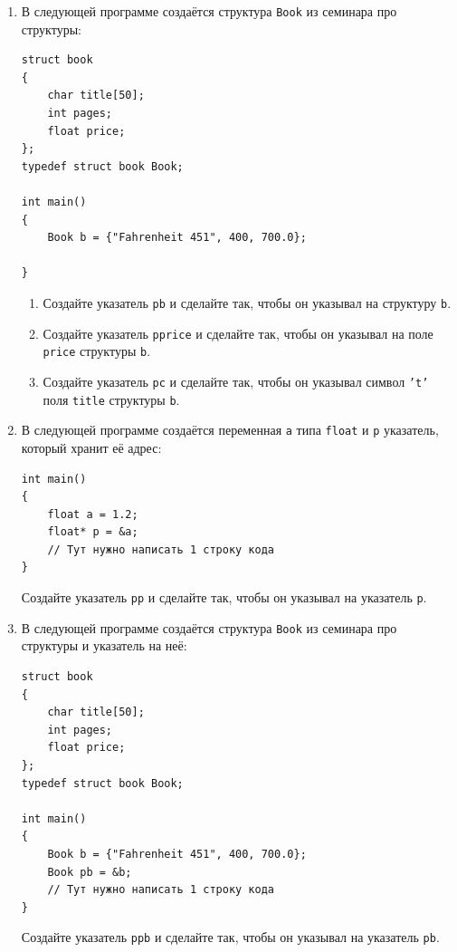 \documentclass{article}
\begin{document}
\begin{enumerate}
\newpage
\item В следующей программе создаётся структура \texttt{Book} из семинара про структуры:
\begin{lstlisting}
struct book 
{
    char title[50];
    int pages;
    float price;
};
typedef struct book Book;

int main() 
{
    Book b = {"Fahrenheit 451", 400, 700.0};

}
\end{lstlisting}

\begin{enumerate}
\item Создайте указатель \texttt{pb} и сделайте так, чтобы он указывал на структуру \texttt{b}.
\item Создайте указатель \texttt{pprice} и сделайте так, чтобы он указывал на поле \texttt{price} структуры \texttt{b}.
\item Создайте указатель \texttt{pc} и сделайте так, чтобы он указывал символ \texttt{'t'} поля \texttt{title} структуры \texttt{b}.
\end{enumerate} 


\item В следующей программе создаётся переменная \texttt{a} типа \texttt{float} и \texttt{p} указатель, который хранит её адрес:
\begin{lstlisting}
int main() 
{
    float a = 1.2;
    float* p = &a;
    // Тут нужно написать 1 строку кода
}
\end{lstlisting}
Создайте указатель \texttt{pp} и сделайте так, чтобы он указывал на указатель \texttt{p}.


\item В следующей программе создаётся структура \texttt{Book} из семинара про структуры и указатель на неё:
\begin{lstlisting}
struct book 
{
    char title[50];
    int pages;
    float price;
};
typedef struct book Book;

int main() 
{
    Book b = {"Fahrenheit 451", 400, 700.0};
    Book pb = &b;
    // Тут нужно написать 1 строку кода
}
\end{lstlisting}
Создайте указатель \texttt{ppb} и сделайте так, чтобы он указывал на указатель \texttt{pb}.


\end{enumerate}

\newpage
\end{document}
